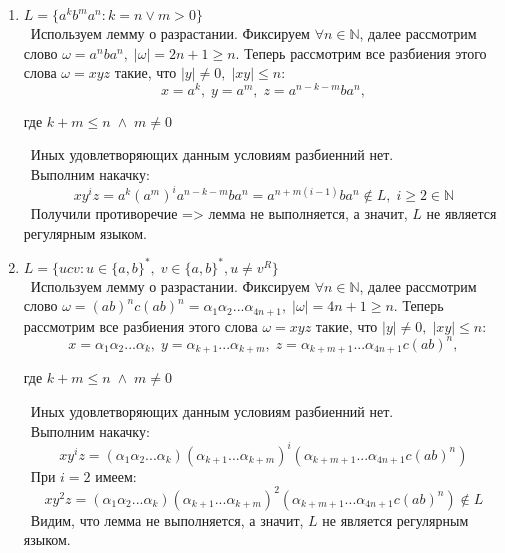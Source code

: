 \documentclass{article}
\begin{document}
\begin{enumerate}
\item \(L = \{a^{k}b^{m}a^{n} : k = n \vee m > 0\}\)\\
\ Используем лемму о разрастании. Фиксируем \(\forall n \in \mathbb{N} \), далее рассмотрим слово \(\omega = a^nba^n, \; |\omega| = 2n + 1 \geqslant n\). Теперь рассмотрим все разбиения этого слова \(\omega = xyz\) такие, что \(|y| \neq 0, \; |xy| \leq n\): \\
$$x = a^{k}, \; y = a^{m}, \; z = a^{n-k-m}ba^{n},$$ 
\begin{center}
где \(k + m \leqslant n \; \wedge \; m \ne 0\)
\end{center} 
\ Иных удовлетворяющих данным условиям разбиенний нет. \\ 
\ Выполним накачку: \\ 
$$xy^{i}z = a^{k}(a^{m})^{i}a^{n-k-m}ba^{n} = a^{n+m(i-1)}ba^{n} \notin L, \; i 
\geqslant 2 \in \mathbb{N} $$
\ Получили противоречие => лемма не выполняется, а значит, \(L\) не является регулярным языком. \\

\item \(L = \{ucv : u \in \{a, b\}^*, \; v \in \{a, b\}^*, u \ne v^R \}\)\\
\ Используем лемму о разрастании. Фиксируем \(\forall n \in \mathbb{N} \), далее рассмотрим слово \(\omega = (ab)^nc(ab)^n = \alpha_1\alpha_2...\alpha_{4n+1}, \; |\omega| = 4n + 1 \geqslant n\). Теперь рассмотрим все разбиения этого слова \(\omega = xyz\) такие, что \(|y| \neq 0, \; |xy| \leq n\): \\
$$x = \alpha_1\alpha_2...\alpha_k, \; y = \alpha_{k+1}...\alpha_{k+m}, \; z = \alpha_{k+m+1}...\alpha_{4n+1}c(ab)^n,$$
\begin{center}
где \(k + m \leqslant n \; \wedge \; m \ne 0\)
\end{center} 
\ Иных удовлетворяющих данным условиям разбиенний нет. \\ 
\ Выполним накачку: \\
$$xy^{i}z = (\alpha_1\alpha_2...\alpha_k)(\alpha_{k+1}...\alpha_{k+m})^i(\alpha_{k+m+1}...\alpha_{4n+1}c(ab)^n)$$
\ При \(i = 2\) имеем: \\
$$xy^{2}z = (\alpha_1\alpha_2...\alpha_k)(\alpha_{k+1}...\alpha_{k+m})^2(\alpha_{k+m+1}...\alpha_{4n+1}c(ab)^n) \notin L$$
\ Видим, что лемма не выполняется, а значит, \(L\) не является регулярным языком. \\

\end {enumerate}
\end{document}
